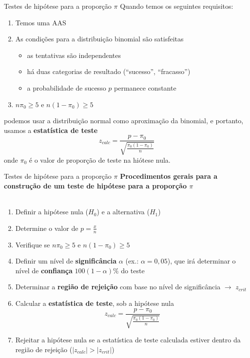 \documentclass[10pt]{beamer}\usepackage[]{graphicx}\usepackage[]{color}
\theoremstyle{definition}
\begin{document}
\begin{frame}{Testes de hipótese para a proporção $\pi$}
  Quando temos os seguintes requisitos:
  \begin{enumerate}
  \item Temos uma AAS
  \item As condições para a distribuição binomial são satisfeitas
    \begin{itemize}
    \item as tentativas são independentes
    \item há duas categorias de resultado (``sucesso'', ``fracasso'')
    \item a probabilidade de sucesso $p$ permanece constante
    \end{itemize}
  \item $n\pi_0 \geq 5$ e $n(1-\pi_0) \geq 5$
  \end{enumerate}
  podemos usar a distribuição normal como aproximação da binomial, e
  portanto, usamos a \textbf{estatística de teste}
  \begin{equation*}
    z_{calc} = \frac{p - \pi_0}{\sqrt{\frac{\pi_0(1-\pi_0)}{n}}}
  \end{equation*}
  onde $\pi_0$ é o valor de proporção de teste na hiótese nula.
\end{frame}

\begin{frame}{Testes de hipótese para a proporção $\pi$}
  \textbf{Procedimentos gerais para a construção de um teste de hipótese
    para a proporção $\pi$} \\~\\
  \begin{enumerate}
  \item Definir a hipótese nula ($H_0$) e a alternativa ($H_1$)
  \item Determine o valor de $p = \frac{x}{n}$
  \item Verifique se $n\pi_0 \geq 5$ e $n(1-\pi_0) \geq 5$
  \item Definir um nível de \textbf{significância} $\alpha$ (ex.: $\alpha
    = 0,05$), que irá determinar o nível de \textbf{confiança}
    $100(1-\alpha)\%$ do teste
  \item Determinar a \textbf{região de rejeição} com base no nível de
    significância $\rightarrow$ $z_{crit}$
  \item Calcular a \textbf{estatística de teste}, sob a hipótese nula
    \begin{equation*}
      z_{calc} = \frac{p - \pi_0}{\sqrt{\frac{\pi_0(1-\pi_0)}{n}}}
    \end{equation*}
  \item Rejeitar a hipótese nula se a estatística de teste calculada
    estiver dentro da região de rejeição ($|z_{calc}| > |z_{crit}|$)
  \end{enumerate}
\end{frame}
\end{document}
